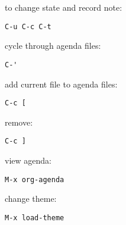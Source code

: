 to change state and record note:
\begin{verbatim}
C-u C-c C-t
\end{verbatim}

cycle through agenda files:
\begin{verbatim}
C-'
\end{verbatim}

add current file to agenda files:
\begin{verbatim}
C-c [ 
\end{verbatim}

remove:
\begin{verbatim}
C-c ]
\end{verbatim}

view agenda:
\begin{verbatim}
M-x org-agenda
\end{verbatim}

change theme:
\begin{verbatim}
M-x load-theme
\end{verbatim}


